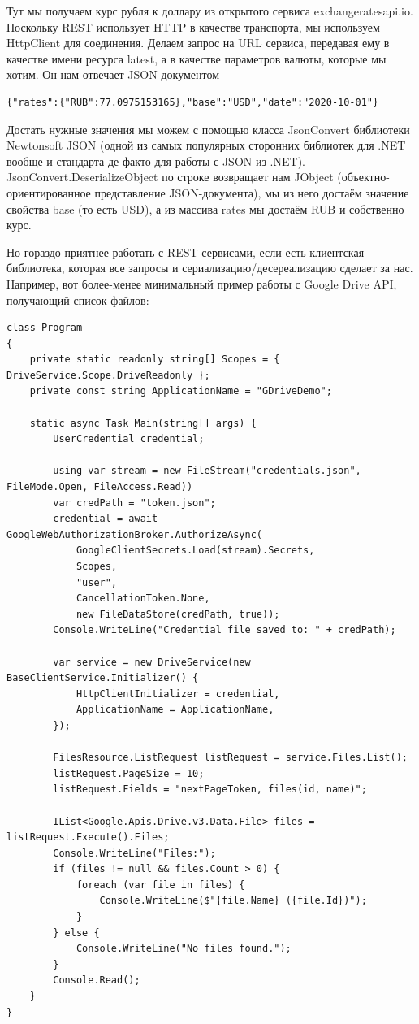 \documentclass{../../text-style}
\begin{document}
Тут мы получаем курс рубля к доллару из открытого сервиса exchangeratesapi.io. Поскольку REST использует HTTP в качестве транспорта, мы используем HttpClient для соединения. Делаем запрос на URL сервиса, передавая ему в качестве имени ресурса latest, а в качестве параметров валюты, которые мы хотим. Он нам отвечает JSON-документом

\begin{verbatim}
{"rates":{"RUB":77.0975153165},"base":"USD","date":"2020-10-01"}
\end{verbatim}

Достать нужные значения мы можем с помощью класса JsonConvert библиотеки Newtonsoft JSON (одной из самых популярных сторонних библиотек для .NET вообще и стандарта де-факто для работы с JSON из .NET). JsonConvert.DeserializeObject по строке возвращает нам JObject (объектно-ориентированное представление JSON-документа), мы из него достаём значение свойства base (то есть USD), а из массива rates мы достаём RUB и собственно курс.


Но гораздо приятнее работать с REST-сервисами, если есть клиентская библиотека, которая все запросы и сериализацию/десереализацию сделает за нас. Например, вот более-менее минимальный пример работы с Google Drive API, получающий список файлов:

\begin{verbatim}
class Program
{
    private static readonly string[] Scopes = { DriveService.Scope.DriveReadonly };
    private const string ApplicationName = "GDriveDemo";

    static async Task Main(string[] args) {
        UserCredential credential;

        using var stream = new FileStream("credentials.json", FileMode.Open, FileAccess.Read))
        var credPath = "token.json";
        credential = await GoogleWebAuthorizationBroker.AuthorizeAsync(
            GoogleClientSecrets.Load(stream).Secrets,
            Scopes,
            "user",
            CancellationToken.None,
            new FileDataStore(credPath, true));
        Console.WriteLine("Credential file saved to: " + credPath);

        var service = new DriveService(new BaseClientService.Initializer() {
            HttpClientInitializer = credential,
            ApplicationName = ApplicationName,
        });

        FilesResource.ListRequest listRequest = service.Files.List();
        listRequest.PageSize = 10;
        listRequest.Fields = "nextPageToken, files(id, name)";

        IList<Google.Apis.Drive.v3.Data.File> files = listRequest.Execute().Files;
        Console.WriteLine("Files:");
        if (files != null && files.Count > 0) {
            foreach (var file in files) {
                Console.WriteLine($"{file.Name} ({file.Id})");
            }
        } else {
            Console.WriteLine("No files found.");
        }
        Console.Read();
    }
}
\end{verbatim}
\end{document}
